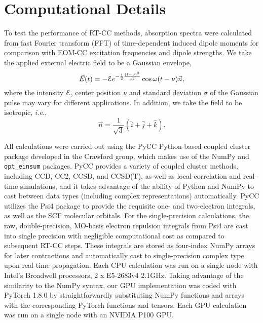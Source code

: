 \section{Computational Details} \label{comp}

To test the performance of RT-CC methods, absorption spectra were calculated
from fast Fourier transform (FFT) of time-dependent induced dipole moments for
comparison with EOM-CC excitation frequencies and dipole strengths.  
We take the applied external electric field to be a Gaussian envelope,
\begin{equation}\label{eq:field}
\vec{E}(t) = - {\cal E}
e^{-\frac{1}{2}\frac{(t-\nu)^2}{\sigma^{2}}} \cos{\omega(t-\nu)} \vec{n},
\end{equation}
where the intensity ${\cal E}$, center position $\nu$ and standard
deviation $\sigma$ of the Gaussian pulse may vary for different
applications.  In addition, we take the field to be isotropic, \textit{i.e.},
\begin{equation}\label{eq:iso-field}
\vec{n} = \frac{1}{\sqrt{3}}(\hat{i} + \hat{j} + \hat{k}).
\end{equation}

All calculations were carried out using the PyCC\cite{pycc} Python-based coupled
cluster package developed in the Crawford group, which makes use of the
NumPy\cite{Harris2020} and {\tt opt\_einsum}\cite{Smith2018} packages.
PyCC provides a variety of coupled cluster methods, including CCD, CC2, CCSD,
and CCSD(T), as well as local-correlation and real-time simulations, and it
takes advantage of the ability of Python and NumPy to cast between data types
(including complex representations) automatically.  PyCC utilizes the Psi4
package\cite{Smith2020} to provide the requisite one- and two-electron integrals,
as well as the SCF molecular orbitals.  For the single-precision calculations, the raw, 
double-precision, MO-basis electron repulsion integrals from Psi4 are cast into single 
precision with negligible computational cost as compared to subsequent RT-CC steps.  
These integrals are stored as four-index NumPy arrays for later contractions and automatically 
cast to single-precision complex type upon real-time propagation. Each CPU calculation was run on a single
node with Intel's Broadwell processors, 2 x E5-2683v4 2.1GHz.  Taking advantage
of the similarity to the NumPy syntax, our GPU implementation was coded with
PyTorch 1.8.0\cite{Paszke2019} by straightforwardly substituting NumPy
functions and arrays with the corresponding PyTorch functions and tensors.  Each
GPU calculation was run on a single node with an NVIDIA P100 GPU.

